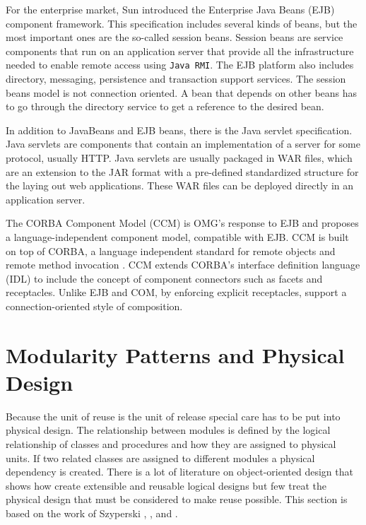For the enterprise market, Sun introduced the Enterprise Java Beans (EJB) component framework. This specification includes several kinds of beans,
but the most important ones are the so-called session beans. Session beans are service components that run on an application server that provide
all the infrastructure needed to enable remote access using \texttt{Java RMI}. The EJB platform also includes directory, messaging, persistence and
transaction support services. The session beans model is not connection oriented. A bean that depends on other beans has to go through the
directory service to get a reference to the desired bean.

In addition to JavaBeans and EJB beans, there is the Java servlet specification. Java servlets are components that contain an implementation
of a server for some protocol, usually HTTP. Java servlets are usually packaged in WAR files, which are an extension to the JAR format
with a pre-defined standardized structure for the laying out web applications. These WAR files can be deployed directly in an application server.

The CORBA Component Model (CCM) is OMG's response to EJB and proposes a language-independent component model, compatible with EJB. CCM is built
on top of CORBA, a language independent standard for remote objects and remote method invocation \cite{CCM}. CCM extends CORBA's interface definition language
(IDL) to include the concept of component connectors such as facets and receptacles. Unlike EJB and COM, by enforcing explicit receptacles, support
a connection-oriented style of composition.

\section{Modularity Patterns and Physical Design}
\label{sec:patterns}

Because the unit of reuse is the unit of release special care has to be put into physical design.
The relationship between modules is defined by the logical relationship of classes and procedures
and how they are assigned to physical units. If two related classes are assigned to different
modules a physical dependency is created. There is a lot of literature on object-oriented design
that shows how create extensible and reusable logical designs but few treat the physical design
that must be considered to make reuse possible. This section is based on the work of Szyperski
\cite{Szyperski}, \cite{Lakos}, \cite{Martin} and \cite{Knoernschild}.

